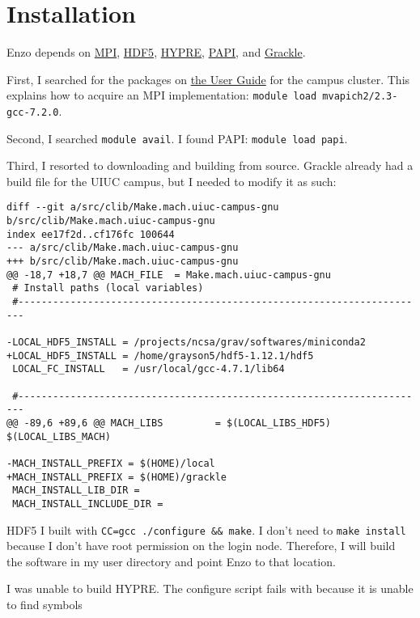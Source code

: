 \section{Installation}
Enzo depends on \href{https://hpc-tutorials.llnl.gov/mpi/}{MPI}, \href{https://www.hdfgroup.org/solutions/hdf5}{HDF5}, \href{https://github.com/hypre-space/hypre}{HYPRE}, \href{https://icl.utk.edu/papi/}{PAPI}, and \href{https://github.com/grackle-project/grackle}{Grackle}.

First, I searched for the packages on \href{https://campuscluster.illinois.edu/resources/docs/user-guide/}{the User Guide} for the campus cluster. This explains how to acquire an MPI implementation: \texttt{module load mvapich2/2.3-gcc-7.2.0}.

Second, I searched \texttt{module avail}. I found PAPI: \texttt{module load papi}.

Third, I resorted to downloading and building from source. Grackle already had a build file for the UIUC campus, but I needed to modify it as such:

\begin{verbatim}
diff --git a/src/clib/Make.mach.uiuc-campus-gnu b/src/clib/Make.mach.uiuc-campus-gnu
index ee17f2d..cf176fc 100644
--- a/src/clib/Make.mach.uiuc-campus-gnu
+++ b/src/clib/Make.mach.uiuc-campus-gnu
@@ -18,7 +18,7 @@ MACH_FILE  = Make.mach.uiuc-campus-gnu
 # Install paths (local variables)
 #-----------------------------------------------------------------------
 
-LOCAL_HDF5_INSTALL = /projects/ncsa/grav/softwares/miniconda2
+LOCAL_HDF5_INSTALL = /home/grayson5/hdf5-1.12.1/hdf5
 LOCAL_FC_INSTALL   = /usr/local/gcc-4.7.1/lib64
 
 #-----------------------------------------------------------------------
@@ -89,6 +89,6 @@ MACH_LIBS         = $(LOCAL_LIBS_HDF5) $(LOCAL_LIBS_MACH)
 
-MACH_INSTALL_PREFIX = $(HOME)/local
+MACH_INSTALL_PREFIX = $(HOME)/grackle
 MACH_INSTALL_LIB_DIR =
 MACH_INSTALL_INCLUDE_DIR =
 \end{verbatim}

HDF5 I built with \texttt{CC=gcc ./configure \&\& make}. I don't need to \texttt{make install} because I don't have root permission on the login node. Therefore, I will build the software in my user directory and point Enzo to that location.

I was unable to build HYPRE. The configure script fails with because it is unable to find symbols


